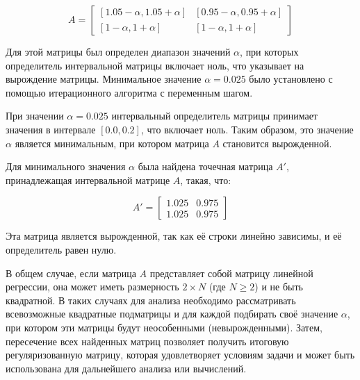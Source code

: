 \documentclass[a4paper,14pt]{article}
\begin{document}
\[
A = \begin{bmatrix}
[1.05 - \alpha, 1.05 + \alpha] & [0.95 - \alpha, 0.95 + \alpha] \\
[1 - \alpha, 1 + \alpha] & [1 - \alpha, 1 + \alpha]
\end{bmatrix}
\]

Для этой матрицы был определен диапазон значений \(\alpha\), при которых определитель интервальной матрицы включает ноль, что указывает на вырождение матрицы. Минимальное значение \(\alpha = 0.025\) было установлено с помощью итерационного алгоритма с переменным шагом.

При значении \(\alpha = 0.025\) интервальный определитель матрицы принимает значения в интервале \([0.0, 0.2]\), что включает ноль. Таким образом, это значение \(\alpha\) является минимальным, при котором матрица \(A\) становится вырожденной.

Для минимального значения \(\alpha\) была найдена точечная матрица \(A'\), принадлежащая интервальной матрице \(A\), такая, что:

\[
A' = \begin{bmatrix}
1.025 & 0.975 \\
1.025 & 0.975
\end{bmatrix}
\]

Эта матрица является вырожденной, так как её строки линейно зависимы, и её определитель равен нулю.

В общем случае, если матрица \(A\) представляет собой матрицу линейной регрессии, она может иметь размерность \(2 \times N\) (где \(N \geq 2\)) и не быть квадратной. В таких случаях для анализа необходимо рассматривать всевозможные квадратные подматрицы и для каждой подбирать своё значение \(\alpha\), при котором эти матрицы будут неособенными (невырожденными). Затем, пересечение всех найденных матриц позволяет получить итоговую регуляризованную матрицу, которая удовлетворяет условиям задачи и может быть использована для дальнейшего анализа или вычислений.
\end{document}
